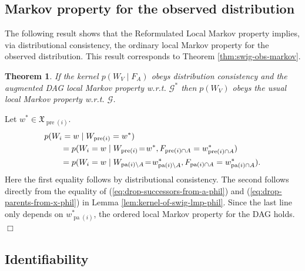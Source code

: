 \documentclass[11pt]{article}
\DeclareMathOperator{\pa}{pa}
\DeclareMathOperator{\pre}{pre}
\newtheorem{theorem}{Theorem}
\newcommand{\G}{{\mathscr G}}
\begin{document}
{\subsection{Markov property for the observed distribution}

The following result shows that the Reformulated Local Markov property implies, via distributional consistency, the ordinary local Markov property for the observed distribution.
This result corresponds to Theorem \ref{thm:swig-obs-markov}.

\begin{theorem}
If the kernel $p(W_V \mid F_A)$ obeys distribution consistency and the augmented DAG local Markov property w.r.t. $\G^*$ then
$p(W_V)$ obeys the usual local Markov property w.r.t. $\G$.
\end{theorem}

  Let $w^* \in \mathfrak{X}_{\pre(i)}$.
\begin{align}
\MoveEqLeft{p(W_i=w \mid W_{\pre(i)}=w^*)}\nonumber\\
&= p(W_i=w \mid W_{\pre(i)}\!=\!w^*, F_{\pre(i)\cap A }=w^*_{\pre(i)\cap A})\nonumber\\
&= p(W_i=w \mid W_{\pa(i)\setminus A}\!=\!w^*_{\pa(i)\setminus A}, F_{\pa(i)\cap A }=w^*_{\pa(i)\cap A}).
\end{align}
Here the first equality follows by distributional consistency.
The second follows directly from the equality of (\ref{eq:drop-successors-from-a-phil}) and (\ref{eq:drop-parents-from-x-phil}) in Lemma \ref{lem:kernel-of-swig-lmp-phil}.
Since the last line only depends on $w^*_{\pa(i)}$, the ordered local Markov property for the DAG holds.
\hfill$\Box$

\subsection{Identifiability}

}
\end{document}
